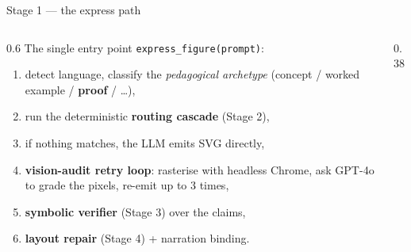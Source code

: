 \documentclass[aspectratio=169,11pt]{beamer}
\begin{document}
\begin{frame}{Stage 1 --- the express path}
  \begin{columns}[T]
  \begin{column}{0.6\textwidth}
  The single entry point \texttt{express\_figure(prompt)}:
  \begin{enumerate}\footnotesize
    \item detect language, classify the \emph{pedagogical archetype}
          (concept / worked example / \textbf{proof} / \dots),
    \item run the deterministic \textbf{routing cascade} (Stage 2),
    \item if nothing matches, the LLM emits SVG directly,
    \item \textbf{vision-audit retry loop}: rasterise with headless
          Chrome, ask GPT-4o to grade the pixels, re-emit up to 3 times,
    \item \textbf{symbolic verifier} (Stage 3) over the claims,
    \item \textbf{layout repair} (Stage 4) + narration binding.
  \end{enumerate}
  \end{column}
  \begin{column}{0.38\textwidth}
    \centering
  \end{column}
  \end{columns}
\end{frame}
\end{document}
